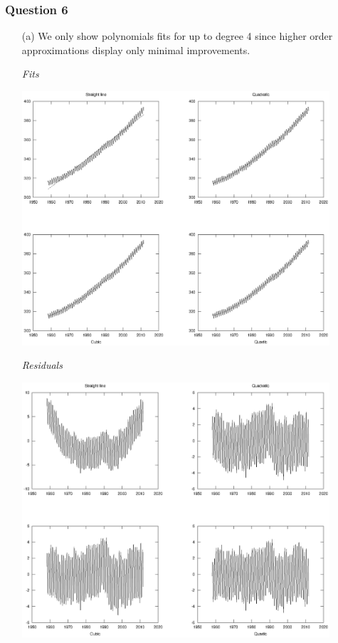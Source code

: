 \documentclass[11pt,a4paper]{article}
\begin{document}
\subsubsection*{Question 6}
\begin{enumerate}
	\item[(a)] We only show polynomials fits for up to degree 4 since higher order approximations display only minimal improvements.
	
	\textit{Fits}
		\begin{center}
			\includegraphics[width=0.9\textwidth]{pfits.eps}
		\end{center}
	\textit{Residuals}
		\begin{center}
			\includegraphics[width=0.9\textwidth]{pres.eps}

\end{center}
\end{enumerate}
\end{document}
